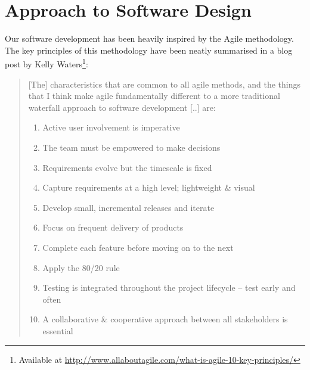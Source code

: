 \section{Approach to Software Design}
\label{sec:design_considerations}

Our software development has been heavily inspired by the Agile methodology. 
The key principles of this methodology have been neatly summarised in a blog post by Kelly Waters\footnote{Available at \url{http://www.allaboutagile.com/what-is-agile-10-key-principles/}}:

\blockquote{
    [The] characteristics that are common to all agile methods, and the things that I think make agile fundamentally different to a more traditional waterfall approach to software development [..] are:
    
    \begin{enumerate}
        \item Active user involvement is imperative 
        \item The team must be empowered to make decisions 
        \item Requirements evolve but the timescale is fixed 
        \item Capture requirements at a high level; lightweight \& visual 
        \item Develop small, incremental releases and iterate 
        \item Focus on frequent delivery of products 
        \item Complete each feature before moving on to the next 
        \item Apply the 80/20 rule 
        \item Testing is integrated throughout the project lifecycle – test early and often 
        \item A collaborative \& cooperative approach between all stakeholders is essential 
    \end{enumerate}
}





